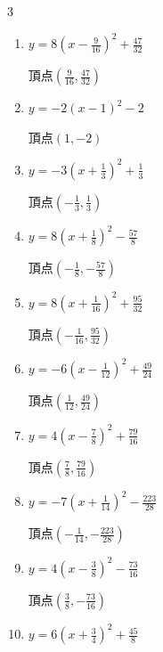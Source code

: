 \begin{multicols}{3}
\begin{enumerate}
        $\displaystyle 頂点\left( -\frac{5}{2} , -\frac{45}{4} \right)$

  \item $\displaystyle y=8\left( x-\frac{9}{16}\right)^{2}+\frac{47}{32}$

        $\displaystyle 頂点\left( \frac{9}{16} , \frac{47}{32} \right)$

  \item $\displaystyle y=-2\left( x-1\right)^{2}-2$

        $\displaystyle 頂点\left( 1 , -2 \right)$

  \item $\displaystyle y=-3\left( x+\frac{1}{3}\right)^{2}+\frac{1}{3}$

        $\displaystyle 頂点\left( -\frac{1}{3} , \frac{1}{3} \right)$

\columnbreak %

\resetques

  \item $\displaystyle y=8\left( x+\frac{1}{8}\right)^{2}-\frac{57}{8}$

        $\displaystyle 頂点\left( -\frac{1}{8} , -\frac{57}{8} \right)$

  \item $\displaystyle y=8\left( x+\frac{1}{16}\right)^{2}+\frac{95}{32}$

        $\displaystyle 頂点\left( -\frac{1}{16} , \frac{95}{32} \right)$

  \item $\displaystyle y=-6\left( x-\frac{1}{12}\right)^{2}+\frac{49}{24}$

        $\displaystyle 頂点\left( \frac{1}{12} , \frac{49}{24} \right)$

  \item $\displaystyle y=4\left( x-\frac{7}{8}\right)^{2}+\frac{79}{16}$

        $\displaystyle 頂点\left( \frac{7}{8} , \frac{79}{16} \right)$

  \item $\displaystyle y=-7\left( x+\frac{1}{14}\right)^{2}-\frac{223}{28}$

        $\displaystyle 頂点\left( -\frac{1}{14} , -\frac{223}{28} \right)$

  \item $\displaystyle y=4\left( x-\frac{3}{8}\right)^{2}-\frac{73}{16}$

        $\displaystyle 頂点\left( \frac{3}{8} , -\frac{73}{16} \right)$

  \item $\displaystyle y=6\left( x+\frac{3}{4}\right)^{2}+\frac{45}{8}$


\end{enumerate}
\end{multicols}
